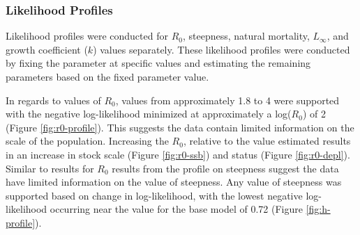 \documentclass[11pt,
  english,
  a4paper,
]{article}
\begin{document}

\hypertarget{likelihood-profiles}{%
\subsubsection{Likelihood Profiles}\label{likelihood-profiles}}

\leavevmode\tagmcend\tagstructend


Likelihood profiles were conducted for {\(R_0\)\leavevmode\tagmcend\tagstructend}, steepness, natural mortality, {\(L_{\infty}\)\leavevmode\tagmcend\tagstructend}, and growth coefficient ({\(k\)\leavevmode\tagmcend\tagstructend}) values separately. These likelihood profiles were conducted by fixing the parameter at specific values and estimating the remaining parameters based on the fixed parameter value.

\leavevmode\tagmcend\tagstructend\par


In regards to values of {\(R_0\)\leavevmode\tagmcend\tagstructend}, values from approximately 1.8 to 4 were supported with the negative log-likelihood minimized at approximately a log({\(R_0\)\leavevmode\tagmcend\tagstructend}) of 2 (Figure \ref{fig:r0-profile}). This suggests the data contain limited information on the scale of the population. Increasing the {\(R_0\)\leavevmode\tagmcend\tagstructend}, relative to the value estimated results in an increase in stock scale (Figure \ref{fig:r0-ssb}) and status (Figure \ref{fig:r0-depl}). Similar to results for {\(R_0\)\leavevmode\tagmcend\tagstructend} results from the profile on steepness suggest the data have limited information on the value of steepness. Any value of steepness was supported based on change in log-likelihood, with the lowest negative log-likelihood occurring near the value for the base model of 0.72 (Figure \ref{fig:h-profile}).

\leavevmode\tagmcend\tagstructend\par
\end{document}
